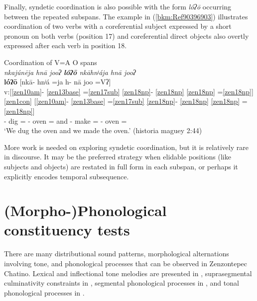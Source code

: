 \documentclass[output=paper]{langscibook}
\begin{document}
\largerpage
Finally, syndetic coordination is also possible with the form \textit{lóʔō} occurring between the repeated subspans. The example in (\ref{bkm:Ref90396903}) illustrates coordination of two verbs with a coreferential subject expressed by a short pronoun on both verbs (position 17) and coreferential direct objects also overtly expressed after each verb in position 18. 



\ea\label{bkm:Ref90396903}Coordination of V=A O spans\\
\textit{ nkajúnēja hnā jooʔ \textbf{lóʔō} nkāhnʲája hnā jooʔ}\\
\glll [nkaj- únē =ja h- nā joo =Vʔ] \textbf{lóʔō} [nkā- hnʲá =ja h- nā joo =Vʔ]\\
v:[\ref{zen10am}{}- \ref{zen13base} =\ref{zen17sub} \ref{zen18np}{}- \ref{zen18np} \ref{zen18np} =\ref{zen18np}] \ref{zen1con} [\ref{zen10am}{}- \ref{zen13base} =\ref{zen17sub} \ref{zen18np}{}- \ref{zen18np} \ref{zen18np} =\ref{zen18np}] \\
\Pfv{}- dig =\First\Excl{} \Obj{}- \Def{} oven =\Ana{} and \Pfv{}- make =\First\Excl{} \Obj{}- \Def{} oven =\Ana{}\\
\glt `We dug the oven and we made the oven.' (historia maguey 2:44)
\z

More work is needed on exploring syndetic coordination, but it is relatively rare in discourse. It may be the preferred strategy when elidable positions (like subjects and objects) are restated in full form in each subspan, or perhaps it explicitly encodes temporal subsequence.

\section{(Morpho-)Phonological constituency tests}
\label{bkm:Ref90318262}
There are many distributional sound patterns, morphological alternations involving tone, and phonological processes that can be observed in Zenzontepec Chatino. Lexical and inflectional tone melodies are presented in , suprasegmental culminativity constraints in , segmental phonological processes in , and tonal phonological processes in .
\end{document}
